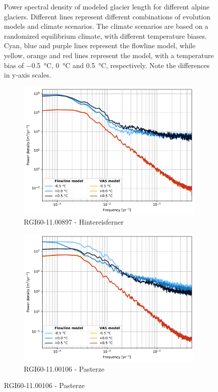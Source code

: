 \begin{figure}[htp]
        \caption{Power spectral density of modeled glacier length for different alpine glaciers. Different lines represent different combinations of evolution models and climate scenarios. The climate scenarios are based on a randomized equilibrium climate, with different temperature biases. Cyan, blue and purple lines represent the flowline model, while yellow, orange and red lines represent the \vas{} model, with a temperature bias of \SI{-.5}{\celsius}, \SI{0}{\celsius} and \SI{+.5}{\celsius}, respectively. Note the differences in y-axis scales.}
        \label{fig:random_length}
      \end{figure}
      
      \begin{figure}[htp]
        \centering
        \begin{subfigure}[b]{0.48\textwidth}
          \caption{RGI60-11.00897 - Hintereisferner}
          \label{fig:psd:hintereisferner}
          \centering
          \includegraphics[width=\textwidth]{../plots/final_plots/psd/Hintereisferner.pdf}
        \end{subfigure}
        \hfill
        \begin{subfigure}[b]{0.48\textwidth}
          \caption{RGI60-11.00106 - Pasterze}
          \label{fig:psd:pasterze}
          \centering
          \includegraphics[width=\textwidth]{../plots/final_plots/psd/Pasterze.pdf}

\end{subfigure}
\end{figure}
